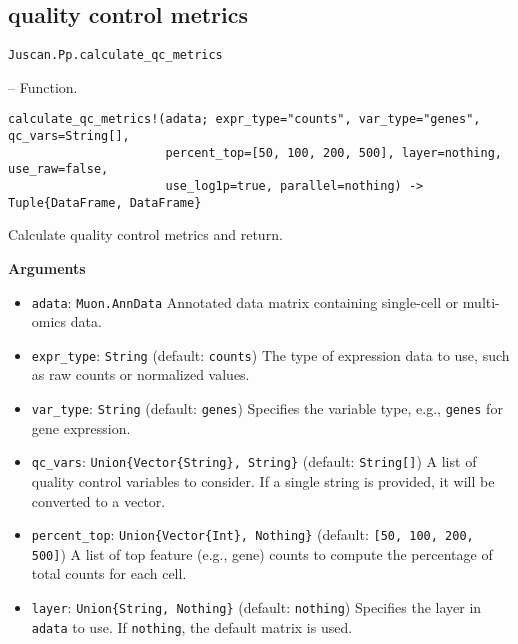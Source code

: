 \documentclass[oneside]{memoir}
\begin{document}
\subsection{quality control metrics}



\label{12647796871482763015}{}

\hypertarget{16333846089314708702}{\texttt{Juscan.Pp.calculate\_qc\_metrics}}  -- {Function.}

\begin{adjustwidth}{2em}{0pt}


\begin{verbatim}
calculate_qc_metrics!(adata; expr_type="counts", var_type="genes", qc_vars=String[], 
                      percent_top=[50, 100, 200, 500], layer=nothing, use_raw=false, 
                      use_log1p=true, parallel=nothing) -> Tuple{DataFrame, DataFrame}
\end{verbatim}

Calculate quality control metrics and return.

\textbf{Arguments}

\begin{itemize}
\item \texttt{adata}: \texttt{Muon.AnnData}   Annotated data matrix containing single-cell or multi-omics data.


\item \texttt{expr\_type}: \texttt{String} (default: \texttt{{\textquotedbl}counts{\textquotedbl}})   The type of expression data to use, such as raw counts or normalized values.


\item \texttt{var\_type}: \texttt{String} (default: \texttt{{\textquotedbl}genes{\textquotedbl}})   Specifies the variable type, e.g., \texttt{{\textquotedbl}genes{\textquotedbl}} for gene expression.


\item \texttt{qc\_vars}: \texttt{Union\{Vector\{String\}, String\}} (default: \texttt{String[]})   A list of quality control variables to consider. If a single string is provided, it will be converted to a vector.


\item \texttt{percent\_top}: \texttt{Union\{Vector\{Int\}, Nothing\}} (default: \texttt{[50, 100, 200, 500]})   A list of top feature (e.g., gene) counts to compute the percentage of total counts for each cell.


\item \texttt{layer}: \texttt{Union\{String, Nothing\}} (default: \texttt{nothing})   Specifies the layer in \texttt{adata} to use. If \texttt{nothing}, the default matrix is used.



\end{itemize}
\end{adjustwidth}
\end{document}
